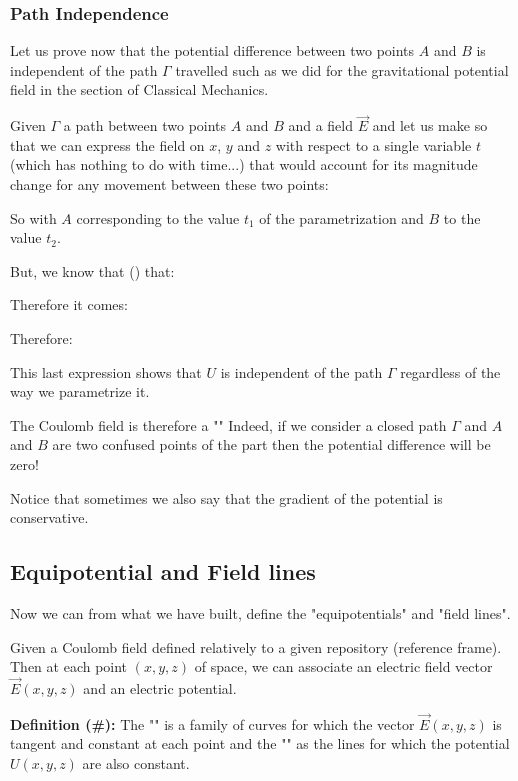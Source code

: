 	
	\pagebreak
	\subsubsection{Path Independence}
	Let us prove now that the potential difference between two points $A$ and $B$ is independent of the path $\Gamma$ travelled such as we did for the gravitational potential field in the section of Classical Mechanics.

	Given $\Gamma$ a path between two points $A$ and $B$ and a field $\vec{E}$ and let us make so that we can express the field on $x$, $y$ and $z$ with respect to a single variable $t$ (which has nothing to do with time...) that would account for its magnitude change for  any movement between these two points:
	
	So with $A$ corresponding to the value $t_1$ of the parametrization and $B$ to the value $t_2$. 
	
	But, we know that () that:
	
	Therefore it comes:
	
	Therefore:
	
	This last expression shows that $U$ is independent of the path $\Gamma$ regardless of the way we parametrize it.
	
	The Coulomb field is therefore a "" Indeed, if we consider a closed path $\Gamma$ and $A$ and $B$ are two confused points of the part then the potential difference will be zero!
	
	Notice that sometimes we also say that the gradient of the potential is conservative.

	\pagebreak
	\subsection{Equipotential and Field lines}
	Now we can from what we have built, define the "equipotentials" and "field lines".
	
	Given a Coulomb field defined relatively to a given repository (reference frame). Then at each point $(x, y, z)$ of space, we can associate an electric field vector $\vec{E}(x,y,z)$ and an electric potential.
	
	\textbf{Definition (\#\mydef):} The "" is a family of curves for which the vector $\vec{E}(x,y,z)$ is tangent and constant at each point and the "\label{equipotentials}" as the lines for which the potential $U (x, y, z)$ are also constant.
	
